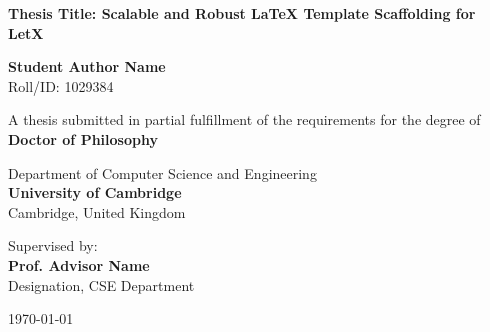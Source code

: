 \begin{titlepage}
\begin{center}
    \vspace*{1cm}
    
    
    \vspace{1.5cm}
    
    {\huge \bfseries \color{primary} Thesis Title: Scalable and Robust LaTeX Template Scaffolding for LetX}
    
    \vspace{1.5cm}
    
    {\Large \bfseries Student Author Name} \\
    \vspace{0.2cm}
    {Roll/ID: 1029384}
    
    \vspace{1.5cm}
    
    {A thesis submitted in partial fulfillment of the requirements for the degree of} \\
    \vspace{0.3cm}
    {\large \bfseries \color{secondary} Doctor of Philosophy}
    
    \vspace{1.5cm}
    
    {Department of Computer Science and Engineering} \\
    \vspace{0.2cm}
    {\large \bfseries \color{primary} University of Cambridge} \\
    \vspace{0.1cm}
    {Cambridge, United Kingdom}
    
    \vfill
    
    {Supervised by:} \\
    {\large \bfseries Prof. Advisor Name} \\
    {Designation, CSE Department}
    
    \vspace{1cm}
    
    {\large \today}
    
\end{center}
\end{titlepage}
